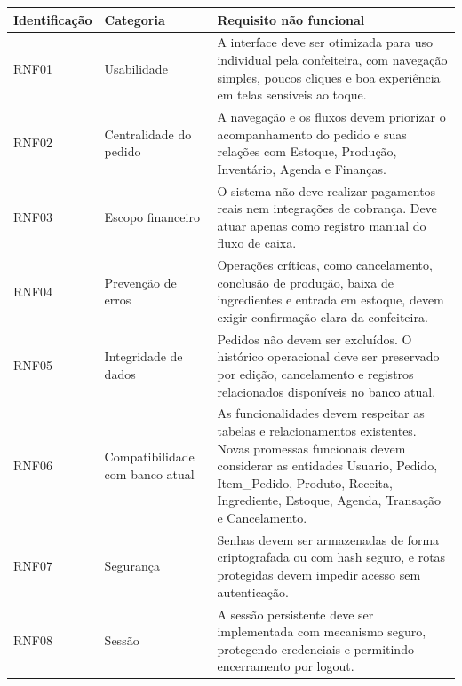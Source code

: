 \begin{quadro}
    \centering
    \label{quadro:requisitos_nao_funcionais}

    \begin{tabular}{|p{3cm}|p{3cm}|p{8cm}|}
        \hline
        \textbf{Identificação} & \textbf{Categoria} & \textbf{Requisito não funcional} \\ \hline

        RNF01 & Usabilidade & A interface deve ser otimizada para uso individual pela confeiteira, com navegação simples, poucos cliques e boa experiência em telas sensíveis ao toque. \\ \hline

        RNF02 & Centralidade do pedido & A navegação e os fluxos devem priorizar o acompanhamento do pedido e suas relações com Estoque, Produção, Inventário, Agenda e Finanças. \\ \hline

        RNF03 & Escopo financeiro & O sistema não deve realizar pagamentos reais nem integrações de cobrança. Deve atuar apenas como registro manual do fluxo de caixa. \\ \hline

        RNF04 & Prevenção de erros & Operações críticas, como cancelamento, conclusão de produção, baixa de ingredientes e entrada em estoque, devem exigir confirmação clara da confeiteira. \\ \hline

        RNF05 & Integridade de dados & Pedidos não devem ser excluídos. O histórico operacional deve ser preservado por edição, cancelamento e registros relacionados disponíveis no banco atual. \\ \hline

        RNF06 & Compatibilidade com banco atual & As funcionalidades devem respeitar as tabelas e relacionamentos existentes. Novas promessas funcionais devem considerar as entidades Usuario, Pedido, Item\_Pedido, Produto, Receita, Ingrediente, Estoque, Agenda, Transação e Cancelamento. \\ \hline

        RNF07 & Segurança &Senhas devem ser armazenadas de forma criptografada ou com hash seguro, e rotas protegidas devem impedir acesso sem autenticação. \\ \hline

        RNF08 & Sessão & A sessão persistente deve ser implementada com mecanismo seguro, protegendo credenciais e permitindo encerramento por logout. \\ \hline


\end{tabular}
\end{quadro}
